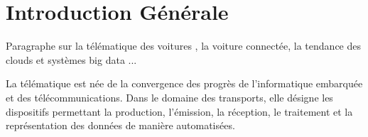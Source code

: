 \section{Introduction Générale}
    Paragraphe sur la télématique des voitures , la voiture connectée, 
    la tendance des clouds et systèmes big data ...


    La télématique est née de la convergence des progrès de l'informatique embarquée et 
    des télécommunications. Dans le domaine des transports, elle désigne les dispositifs 
    permettant la production, l'émission, la réception, le traitement et la représentation 
    des données de manière automatisées.
